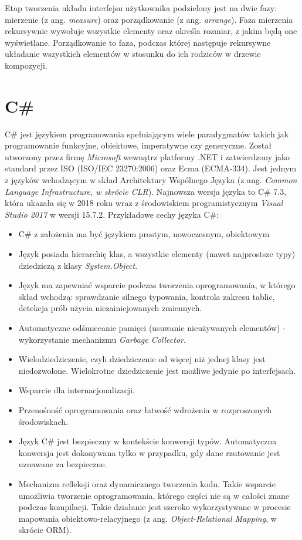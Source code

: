 Etap tworzenia układu interfejsu użytkownika podzielony jest na dwie fazy: mierzenie (z ang. \textit{measure}) oraz porządkowanie (z ang. \textit{arrange}). Faza mierzenia rekursywnie wywołuje wszystkie elementy oraz określa rozmiar, z jakim będą one wyświetlane. Porządkowanie to faza, podczas której następuje rekursywne układanie wszystkich elementów w stosunku do ich rodziców w drzewie kompozycji. 

\section{C\#}
 C\# jest językiem programowania spełniającym wiele paradygmatów takich jak programowanie funkcyjne, obiektowe, imperatywne czy generyczne. Został utworzony przez firmę \textit{Microsoft} wewnątrz platformy .NET i zatwierdzony jako standard przez ISO (ISO/IEC 23270:2006) oraz Ecma (ECMA-334). Jest jednym z języków wchodzącym w skład Architektury Wspólnego Języka (z ang. \textit{Common Language Infrastructure, w skrócie CLR}). Najnowsza wersja języka to C\# 7.3, która ukazała się w 2018 roku wraz z środowiskiem programistycznym \textit{Visual Studio 2017} w wersji 15.7.2.
 Przykładowe cechy języka C\#:
 \begin{itemize}
 	\item C\# z założenia ma być językiem prostym, nowoczesnym, obiektowym
 	\item Język posiada hierarchię klas, a wszystkie elementy (nawet najprostsze typy) dziedziczą z klasy \textit{System.Object}.
 	\item Język ma zapewniać wsparcie podczas tworzenia oprogramowania, w którego skład wchodzą: sprawdzanie silnego typowania, kontrola zakresu tablic, detekcja prób użycia niezainicjowanych zmiennych.
 	\item Automatyczne odśmiecanie pamięci (usuwanie nieużywanych elementów) - wykorzystanie mechanizmu \textit{Garbage Collector}.
 	\item Wielodziedziczenie, czyli dziedziczenie od więcej niż jednej klasy jest niedozwolone. Wielokrotne dziedziczenie jest możliwe jedynie po interfejsach.
 	\item Wsparcie dla internacjonalizacji.
 	\item Przenośność oprogramowania oraz łatwość wdrożenia w rozproszonych środowiskach. 
 	\item Język C\# jest bezpieczny w kontekście konwersji typów. Automatyczna konwersja jest dokonywana tylko w przypadku, gdy dane rzutowanie jest uznawane za bezpieczne.
 	\item Mechanizm refleksji oraz dynamicznego tworzenia kodu. Takie wsparcie umożliwia tworzenie oprogramowania, którego części nie są w całości znane podczas kompilacji.
 	Takie działanie jest szeroko wykorzystywane w procesie mapowania obiektowo-relacyjnego (z ang. \textit{Object-Relational Mapping}, w skrócie ORM).
 \end{itemize} 

